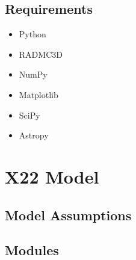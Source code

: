 \documentclass[a4paper,11pt,english]{sphinxmanual}
\begin{document}
\section{Requirements}
\label{\detokenize{introduction:requirements}}\begin{itemize}
\item {} 
\sphinxAtStartPar
Python

\item {} 
\sphinxAtStartPar
RADMC\sphinxhyphen{}3D

\item {} 
\sphinxAtStartPar
NumPy

\item {} 
\sphinxAtStartPar
Matplotlib

\item {} 
\sphinxAtStartPar
SciPy

\item {} 
\sphinxAtStartPar
Astropy

\end{itemize}

\sphinxstepscope


\chapter{X22 Model}
\label{\detokenize{x22:x22-model}}\label{\detokenize{x22::doc}}

\section{Model Assumptions}
\label{\detokenize{x22:model-assumptions}}

\section{Modules}
\label{\detokenize{x22:modules}}
\end{document}
